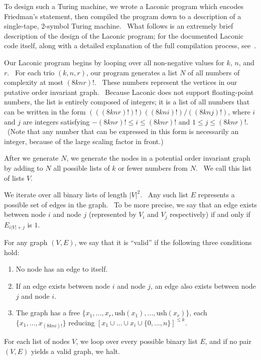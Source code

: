 \documentclass[11pt]{article}
\begin{document}
To design such a Turing machine, we wrote a Laconic program which encodes Friedman's statement, then compiled the program down to a description of a single-tape, $2$-symbol Turing machine. \ What follows is an extremely brief description of the design of the Laconic program; for the documented Laconic code itself, along with a detailed explanation of the full compilation process, see~\cite{github}.

Our Laconic program begins by looping over all non-negative values for $k$, $n$, and $r$. \ For each trio $(k, n, r)$, our program generates a list $N$ of all numbers of complexity at most $(8knr)!$. \ These numbers represent the vertices in our putative order invariant graph. \ Because Laconic does not support floating-point numbers, the list is entirely composed of integers; it is a list of all numbers that can be written in the form $(((8knr)!)!)((8kni)!)/((8knj)!)$, where $i$ and $j$ are integers satisfying $-(8knr)! \le i \le (8knr)!$ and $1 \le j \le (8knr)!$. \ (Note that any number that can be expressed in this form is necessarily an integer, because of the large scaling factor in front.)

After we generate $N$, we generate the nodes in a potential order invariant graph by adding to $N$ all possible lists of $k$ or fewer numbers from $N$. \ We call this list of lists $V$.

We iterate over all binary lists of length $|V|^2$. \ Any such list $E$ represents a possible set of edges in the graph. \ To be more precise, we say that an edge exists between node $i$ and node $j$ (represented by $V_i$ and $V_j$ respectively) if and only if $E_{i|V| + j}$ is $1$.

For any graph $(V, E)$, we say that it is ``valid'' if the following three conditions hold:

\begin{enumerate}

\item No node has an edge to itself.
\item If an edge exists between node $i$ and node $j$, an edge also exists between node $j$ and node $i$.
\item The graph has a free $\{x_1,\dots,x_r, \textrm{ush}(x_1),...,\textrm{ush}(x_r)\}$, each  $\{x_1, \dots, x_{(8kni)!}\}$ reducing $[x_1 \cup \dots \cup x_i \cup \{0,\dots,n\}]^{\le k}$.

\end{enumerate}

For each list of nodes $V$, we loop over every possible binary list $E$, and if no pair $(V, E)$ yields a valid graph, we halt.
\end{document}

